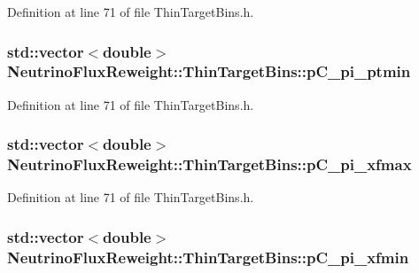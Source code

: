 Definition at line 71 of file Thin\-Target\-Bins.\-h.

\hypertarget{class_neutrino_flux_reweight_1_1_thin_target_bins_aa64b0a70969bf8e75d8c5bb9b0c902dd}{
\subsubsection[{p\-C\-\_\-pi\-\_\-ptmin}]{\setlength{\rightskip}{0pt plus 5cm}std\-::vector$<$double$>$ Neutrino\-Flux\-Reweight\-::\-Thin\-Target\-Bins\-::p\-C\-\_\-pi\-\_\-ptmin}}\label{class_neutrino_flux_reweight_1_1_thin_target_bins_aa64b0a70969bf8e75d8c5bb9b0c902dd}


Definition at line 71 of file Thin\-Target\-Bins.\-h.

\hypertarget{class_neutrino_flux_reweight_1_1_thin_target_bins_a052a668add3b703e7be93e09b02e49c7}{
\subsubsection[{p\-C\-\_\-pi\-\_\-xfmax}]{\setlength{\rightskip}{0pt plus 5cm}std\-::vector$<$double$>$ Neutrino\-Flux\-Reweight\-::\-Thin\-Target\-Bins\-::p\-C\-\_\-pi\-\_\-xfmax}}\label{class_neutrino_flux_reweight_1_1_thin_target_bins_a052a668add3b703e7be93e09b02e49c7}


Definition at line 71 of file Thin\-Target\-Bins.\-h.

\hypertarget{class_neutrino_flux_reweight_1_1_thin_target_bins_a87af8428f4ca3ce237afedb5bce1e869}{
\subsubsection[{p\-C\-\_\-pi\-\_\-xfmin}]{\setlength{\rightskip}{0pt plus 5cm}std\-::vector$<$double$>$ Neutrino\-Flux\-Reweight\-::\-Thin\-Target\-Bins\-::p\-C\-\_\-pi\-\_\-xfmin}}\label{class_neutrino_flux_reweight_1_1_thin_target_bins_a87af8428f4ca3ce237afedb5bce1e869}


